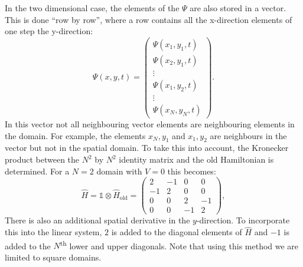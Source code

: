 In the two dimensional case, the elements of the $\Psi$ are also stored in a vector. This is done ``row by row'', where a row contains all the x-direction elements of one step the y-direction:
\[
\Psi(x,y,t) =
 \begin{pmatrix}
    \Psi(x_1,y_1,t)     \\
    \Psi(x_2,y_1,t)     \\
    \vdots              \\
    \Psi(x_1,y_2,t)     \\
    \vdots              \\
    \Psi(x_N,y_N,t)
 \end{pmatrix}.
 \] In this vector not all neighbouring vector elements are neighbouring elements in the domain. For example, the elements  $x_N,y_1$ and $x_1,y_2$ are neighbours in the vector but not in the spatial domain. To take this into account, the Kronecker product between the $N^2$ by $N^2$ identity matrix and the old Hamiltonian is determined. For a $N=2$ domain with $V=0$ this becomes:
 \[
\hat{H} = \mathbb{1} \otimes \hat{H}_\text{old} =
 \begin{pmatrix}
    2   & -1    & 0     & 0     \\
    -1  & 2     & 0     & 0     \\
    0   & 0     & 2     & -1    \\
    0   & 0     & -1    & 2
 \end{pmatrix},
 \] There is also an additional spatial derivative in the $y$-direction. To incorporate this into the linear system, $2$ is added to the diagonal elements of $\hat{H}$ and $-1$ is added to the $N$\textsuperscript{th} lower and upper diagonals. Note that using this method we are limited to square domains.
